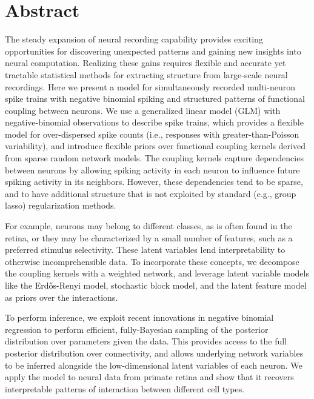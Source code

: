 \documentclass[aos,noinfoline]{imsart} %
\begin{document}
\section*{Abstract}
The steady expansion of neural recording capability provides exciting
opportunities for discovering unexpected patterns and gaining new
insights into neural computation.  Realizing these gains requires
flexible and accurate yet tractable statistical methods for extracting
structure from large-scale neural recordings. Here we present a model
for simultaneously recorded multi-neuron spike trains with negative
binomial spiking and structured patterns of functional coupling
between neurons. We use a generalized linear model (GLM) with
negative-binomial observations to describe spike trains, which
provides a flexible model for over-dispersed spike counts (i.e.,
responses with greater-than-Poisson variability), and introduce
flexible priors over functional coupling kernels derived from
sparse random network models. The coupling kernels capture
dependencies between neurons by allowing spiking activity in each
neuron to influence future spiking activity in its neighbors. However,
these dependencies tend to be sparse, and to have additional structure
that is not exploited by standard (e.g., group lasso) regularization
methods.  

For example, neurons may belong to different classes, as is often found in the retina, or they may be characterized by a small number of features, such as a preferred stimulus selectivity. These latent variables lend interpretability to otherwise incomprehensible data.  To incorporate these concepts, we decompose the coupling kernels with a weighted network, and leverage latent variable models like the Erd\H{o}s-Renyi model, stochastic block model, and the latent feature model as priors over the interactions. 

To perform inference, we exploit recent innovations in
negative binomial regression to perform efficient, fully-Bayesian
sampling of the posterior distribution over parameters given the
data. This provides access to the full posterior distribution over
connectivity, and allows underlying network variables to be inferred
alongside the low-dimensional latent variables of each
neuron.  We apply the model to neural data from primate retina and
show that it recovers interpretable patterns of interaction between different  cell types.


\end{document}
